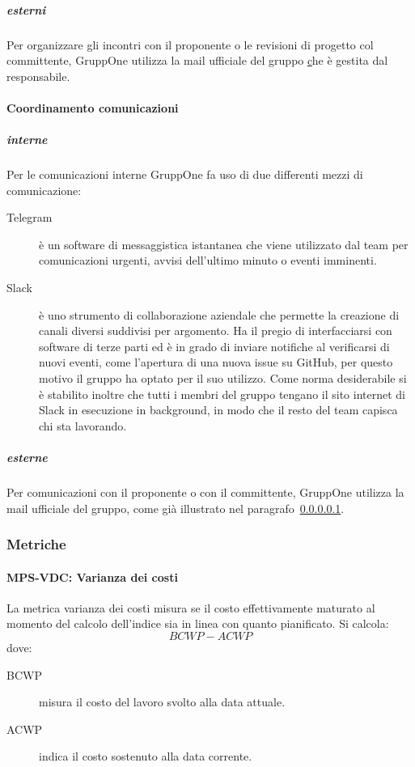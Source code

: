 \documentclass[../norme-di-progetto.tex]{subfiles}
\begin{document}
\subparagraph{esterni}%
\label{subp:coordinamento_incontri/esterni}
Per organizzare gli incontri con il proponente o le revisioni di progetto col committente, GruppOne utilizza la mail ufficiale del gruppo \href{gruppone.swe@gmail.com} che è gestita dal responsabile.

\paragraph{Coordinamento comunicazioni}%
\label{par:coordinamento_comunicazioni}

\subparagraph{interne}%
\label{subp:coordinamento_comunicazioni/interne}
Per le comunicazioni interne GruppOne fa uso di due differenti mezzi di comunicazione:
\begin{description}
  \item [Telegram] è un software di messaggistica istantanea che viene utilizzato dal team per comunicazioni urgenti, avvisi dell'ultimo minuto o eventi imminenti.
  \item [Slack] è uno strumento di collaborazione aziendale che permette la creazione di canali diversi suddivisi per argomento. Ha il pregio di interfacciarsi con software di terze parti ed è in grado di inviare notifiche al verificarsi di nuovi eventi, come l'apertura di una nuova issue su GitHub, per questo motivo il gruppo ha optato per il suo utilizzo. Come norma desiderabile si è stabilito inoltre che tutti i membri del gruppo tengano il sito internet di Slack in esecuzione in background, in modo che il resto del team capisca chi sta lavorando.
\end{description}

\subparagraph{esterne}%
\label{subp:esterne}
Per comunicazioni con il proponente o con il committente, GruppOne utilizza la mail ufficiale del gruppo, come già illustrato nel paragrafo~\ref{subp:coordinamento_incontri/esterni}.


\subsubsection{Metriche}%
\label{subs:gestione_del_personale/metriche}

\paragraph{MPS-VDC\@: Varianza dei costi}%
\label{par:MPS-VDC_varianza_dei_costi}

La metrica varianza dei costi misura se il costo effettivamente maturato al momento del calcolo dell'indice sia in linea con quanto pianificato. Si calcola:
\[
  BCWP-ACWP
\]
dove:
\begin{description}
  \item [BCWP] misura il costo del lavoro svolto alla data attuale.
  \item [ACWP] indica il costo sostenuto alla data corrente.
\end{description}
\end{document}
